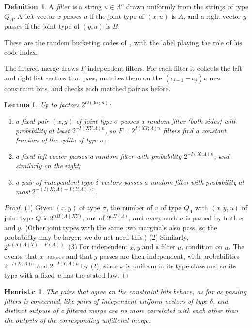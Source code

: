 \documentclass[11pt]{article}
\newtheorem{lemma}[theorem]{Lemma}
\newtheorem{heuristic}{Heuristic}
\theoremstyle{definition}
\newtheorem{definition}[theorem]{Definition}
\theoremstyle{remark}
\begin{document}
\begin{definition}
A \emph{filter} is a string $u\in\Lambda^n$ drawn uniformly from the strings of type $Q_\Lambda$. A left vector $x$
\emph{passes} $u$ if the joint type of $(x,u)$ is $A$, and a right vector $y$ passes if the joint type of $(y,u)$ is $B$.
\end{definition}
These are the random bucketing codes of~\cite{Dub10}, with the label playing the role of his code index.

The filtered merge draws $F$ independent filters. For each filter it collects the left and right list vectors that
pass, matches them on the $(c_{j-1}-c_j)n$ new constraint bits, and checks each matched pair as before.

\begin{lemma}\label{lem:filter}
Up to factors $2^{O(\log n)}$:
\begin{enumerate}
\item a fixed pair $(x,y)$ of joint type $\sigma$ passes a random filter (both sides) with probability at least
$2^{-I(XY;\Lambda)n}$, so $F=2^{I(XY;\Lambda)n}$ filters find a constant fraction of the splits of type $\sigma$;
\item a fixed left vector passes a random filter with probability $2^{-I(X;\Lambda)n}$, and similarly on the right;
\item a pair of independent type-$\delta$ vectors passes a random filter with probability at most
$2^{-(I(X;\Lambda)+I(Y;\Lambda))n}$.
\end{enumerate}
\end{lemma}
\begin{proof}
(1) Given $(x,y)$ of type $\sigma$, the number of $u$ of type $Q_\Lambda$ with $(x,y,u)$ of joint type $Q$ is
$2^{nH(\Lambda\mid XY)}$, out of $2^{nH(\Lambda)}$, and every such $u$ is passed by both $x$ and $y$. (Other joint
types with the same two marginals also pass, so the probability may be larger; we do not need this.)
(2) Similarly, $2^{n(H(\Lambda\mid X)-H(\Lambda))}$.
(3) For independent $x,y$ and a filter $u$, condition on $u$. The events that $x$ passes and that $y$ passes are then
independent, with probabilities $2^{-I(X;\Lambda)n}$ and $2^{-I(Y;\Lambda)n}$ by (2), since $x$ is uniform in its
type class and so its type with a fixed $u$ has the stated law.
\end{proof}

\begin{heuristic}\label{heur:filter}
The pairs that agree on the constraint bits behave, as far as passing filters is concerned, like pairs of independent
uniform vectors of type $\delta$, and distinct outputs of a filtered merge are no more correlated with each other
than the outputs of the corresponding unfiltered merge.
\end{heuristic}
\end{document}
